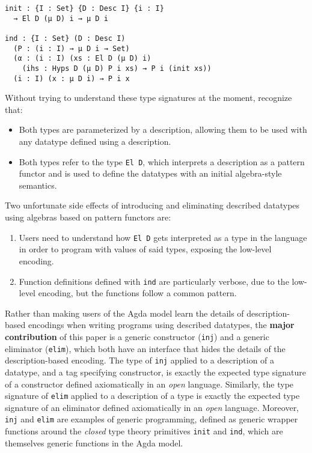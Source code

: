 \documentclass[nonatbib]{sigplanconf}
\begin{document}
\begin{verbatim}
init : {I : Set} {D : Desc I} {i : I}
  → El D (μ D) i → μ D i

ind : {I : Set} (D : Desc I)
  (P : (i : I) → μ D i → Set)
  (α : (i : I) (xs : El D (μ D) i)
    (ihs : Hyps D (μ D) P i xs) → P i (init xs))
  (i : I) (x : μ D i) → P i x
\end{verbatim}

Without trying to understand these type signatures at the moment,
recognize that:

\begin{itemize}
\item{}
Both types are parameterized by a description, allowing them to be used with any
datatype defined using a description.
\item{}
Both types refer to the type {\tt El D}, which interprets a
description as a pattern functor and is used to define the datatypes with an
initial algebra-style semantics.
\end{itemize}

Two unfortunate side effects of introducing and eliminating described
datatypes using algebras based on pattern functors are:

\begin{enumerate}
\item{}
Users need to understand how {\tt El D} gets interpreted as a type in
the language in order to program with values of said types, exposing
the low-level encoding.
\item{}
Function definitions defined with {\tt ind} are particularly verbose,
due to the low-level encoding, but the functions follow a common
pattern.
\end{enumerate}

Rather than making users of the {\sc Agda} model learn the details of
description-based encodings when writing programs using described
datatypes,
the {\bf major contribution} of
this paper is a generic constructor ({\tt inj}) and a generic
eliminator ({\tt elim}), which both have an interface that hides the
details of the description-based encoding.
The type of {\tt inj} applied to a
description of a datatype, and a tag specifying constructor, is exactly the
expected type signature of a constructor defined axiomatically in an
{\it open} language. Similarly, the type signature of {\tt elim} applied to
a description of a type is exactly the expected type signature
of an eliminator defined axiomatically in an {\it open} language.
Moreover, {\tt inj} and {\tt elim} are examples of generic
programming, defined as generic wrapper functions around the
{\it closed} type theory primitives {\tt init}
and {\tt ind}, which are themselves generic functions in the
{\sc Agda} model.
\end{document}
